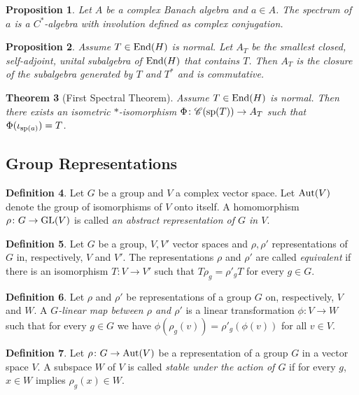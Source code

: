\documentclass[12pt]{article}
\newtheorem{theorem}{Theorem}[section]
\newtheorem{prop}[theorem]{Proposition}
\theoremstyle{definition}
\newtheorem{dfn}[theorem]{Definition}
\theoremstyle{remark}
\newcommand{\End}[1]{\textup{End}(#1)}
\begin{document}
    \begin{prop}
        Let $A$ be a complex Banach algebra and $a\in A$. The spectrum of $a$ is a $C^*$-algebra with involution defined as complex conjugation.
    \end{prop}

    \begin{prop}
        Assume $T\in\End{H}$ is normal. Let $A_T$ be the smallest closed, self-adjoint, unital subalgebra of $\End{H}$ that contains $T$. Then $A_T$ is the closure of the subalgebra generated by $T$ and $T^*$ and is commutative.
    \end{prop}

    \begin{theorem}[First Spectral Theorem]
        Assume $T\in\End{H}$ is normal. Then there exists an isometric $*$-isomorphism $\Phi\colon \mathscr{C}(\textup{sp}(T))\to A_T$ such that $\Phi(\iota_{\textup{sp}(a)})=T$.
    \end{theorem}
    

    \subsection{Group Representations}

    \begin{dfn}
        Let $G$ be a group and $V$ a complex vector space. Let $\textup{Aut}(V)$ denote the group of isomorphisms of $V$ onto itself. A homomorphism $\rho\colon G\to\textup{GL}(V)$ is called \emph{an abstract representation of $G$ in $V$}.
    \end{dfn}

    \begin{dfn}
        Let $G$ be a group, $V,V'$ vector spaces and $\rho,\rho'$ representations of $G$ in, respectively, $V$ and $V'$. The representations $\rho$ and $\rho'$ are called \emph{equivalent} if there is an isomorphism $T\colon V \to V'$ such that
        $ T\rho_g=\rho'_gT $
        for every $g \in G$.
    \end{dfn}

    \begin{dfn}
        Let $\rho$ and $\rho'$ be representations of a group $G$ on, respectively, $V$ and $W$. A \emph{$G$-linear map between $\rho$ and $\rho'$} is a linear transformation $\phi\colon V\to W$ such that for every $g\in G$ we have $\phi(\rho_g(v))=\rho'_g(\phi(v))$ for all $v\in V$.
    \end{dfn}

    \begin{dfn}
        Let $\rho\colon G \to \textup{Aut}(V)$ be a representation of a group $G$ in a vector space $V$. A subspace $W$ of $V$ is called \emph{stable under the action of $G$} if for every $g$, $x \in W$ implies $\rho_g(x) \in W$.
    \end{dfn}
\end{document}
